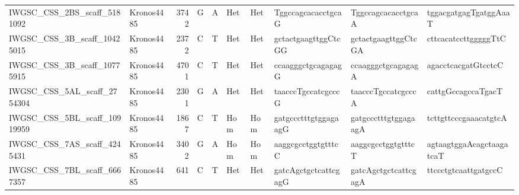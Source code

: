 \begin{tabular}{llrlllllll}
 IWGSC\_CSS\_2BS\_scaff\_5181092  & Kronos4485 &  3742 & G    & A     & Het    & Het   & TggccagcacacctgcaG       & TggccagcacacctgcaA       & tggacgatgagTgatggAaaT    \\
 IWGSC\_CSS\_3B\_scaff\_10425015  & Kronos4485 &  2372 & C    & T     & Het    & Het   & gctactgaagttggCtcGG      & gctactgaagttggCtcGA      & cttcacatccttgggggTtC     \\
 IWGSC\_CSS\_3B\_scaff\_10775915  & Kronos4485 &  4701 & C    & T     & Het    & Het   & ccaagggctgcagagagG       & ccaagggctgcagagagA       & agacctcacgatGtcctcC      \\
 IWGSC\_CSS\_5AL\_scaff\_2754304  & Kronos4485 &  2301 & G    & A     & Het    & Het   & taacccTgccatcgcccG       & taacccTgccatcgcccA       & cattgGccagccaTgacT       \\
 IWGSC\_CSS\_5BL\_scaff\_10919959 & Kronos4485 &  1867 & C    & T     & Hom    & Hom   & gatgccctttgtggagaagG     & gatgccctttgtggagaagA     & tcttgttcccgaaacatgtcA    \\
 IWGSC\_CSS\_7AS\_scaff\_4245431  & Kronos4485 &  3402 & G    & A     & Hom    & Hom   & aaggcgcctggtgtttcC       & aaggcgcctggtgtttcT       & agtaagtggaAcagctaagatcaT \\
 IWGSC\_CSS\_7BL\_scaff\_6667357  & Kronos4485 &   641 & C    & T     & Het    & Het   & gatcAgctgctcattcgagG     & gatcAgctgctcattcgagA     & ttccctgtcaattgatgccC     \\
\bottomrule
\end{tabular}
